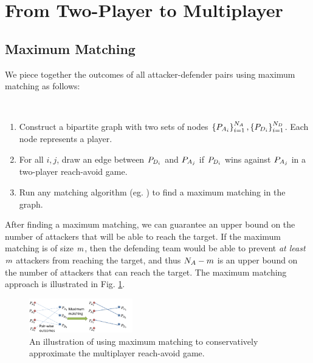 \section{From Two-Player to Multiplayer} \label{sec:two_to_multi}

\subsection{Maximum Matching}
\label{subsec:max_match}
We piece together the outcomes of all attacker-defender pairs using maximum matching as follows:

\begin{alg}~
\begin{enumerate}
\item Construct a bipartite graph with two sets of nodes $\left\{P_{A_{i}}\right\}_{i=1}^{N_A},\left\{P_{D_{i}}\right\}_{i=1}^{N_D}$. Each node represents a player.
\item For all $i,j$, draw an edge between $P_{D_{i}}$ and $P_{A_{j}}$ if $P_{D_{i}}$ wins against $P_{A_{j}}$ in a two-player reach-avoid game.
\item Run any matching algorithm (eg. \cite{Schrjiver2004, Karpinski1998}) to find a maximum matching in the graph. %
\end{enumerate}
\end{alg}

After finding a maximum matching, we can guarantee an upper bound on the number of attackers that will be able to reach the target. If the maximum matching is of size $m$, then the defending team would be able to prevent \textit{at least} $m$ attackers from reaching the target, and thus $N_A-m$ is an upper bound on the number of attackers that can reach the target. The maximum matching approach is illustrated in Fig. \ref{fig:general_procedure}.

\begin{figure}
\centering
\includegraphics[width=0.4\textwidth]{"fig/general procedure"}
\caption{An illustration of using maximum matching to conservatively approximate the multiplayer reach-avoid game.}
\label{fig:general_procedure}
\end{figure}

